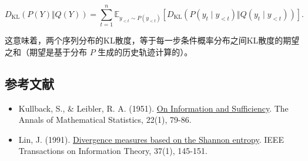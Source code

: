 \[
D_{\mathrm{KL}}(P(Y)\Vert Q(Y))
=
\sum_{t=1}^{n}
\mathbb{E}_{y_{<t}\sim P(y_{<t})}
\left[
D_{\mathrm{KL}}\left(P(y_t\mid y_{<t})\Vert Q(y_t\mid y_{<t})\right)
\right].
\]

这意味着，两个序列分布的KL散度，等于每一步条件概率分布之间KL散度的期望之和（期望是基于分布 \(P\) 生成的历史轨迹计算的）。

\FloatBarrier
{}
\hypertarget{ux53c2ux8003ux6587ux732e-107}{%
\subsection{参考文献}\label{ux53c2ux8003ux6587ux732e-107}}

\vspace{0.25em}
\begin{itemize}
\tightlist
\item
  Kullback, S., \& Leibler, R. A. (1951). \href{https://doi.org/10.1214/aoms/1177729694}{On Information and Sufficiency}. The Annals of Mathematical Statistics, 22(1), 79-86.
\item
  Lin, J. (1991). \href{https://doi.org/10.1109/18.61115}{Divergence measures based on the Shannon entropy}. IEEE Transactions on Information Theory, 37(1), 145-151.
\end{itemize}

\clearpage
